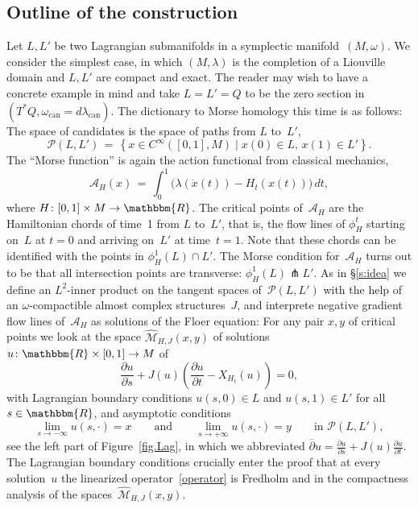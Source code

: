 \documentclass[12pt,twoside]{amsart}
\theoremstyle{plain}
\numberwithin{figure}{section}
\numberwithin{equation}{section}
\def\can{\operatorname{can}}
\def\go{\omega}
\def\ca{{\mathcal A}}
\def\cm{{\mathcal M}}
\def\cp{{\mathcal P}}
\def\RR{\mathbbm{R}}
\def\pp{\partial}
\begin{document}
\subsection{Outline of the construction}
Let $L, L'$ be two Lagrangian submanifolds in a symplectic manifold~$(M,\go)$.
We consider the simplest case, in which $(M,\lambda)$ is the completion of a Liouville domain
and $L,L'$ are compact and exact.
The reader may wish to have a concrete example in mind and take
$L=L'=Q$ to be the zero section in $(T^*Q, \omega_{\can} = d \lambda_{\can})$.
The dictionary to Morse homology this time is as follows:
The space of candidates is the space of paths from $L$ to~$L'$,
$$
\cp (L,L') \,=\, \left\{ x \in C^\infty ([0,1], M) \mid x(0) \in L,\, x(1) \in L' \right\} .
$$
The ``Morse function'' is again the action functional from classical mechanics, 
$$
\ca_H (x) \,=\, \int_0^1 \bigl( \lambda(\dot x(t)) - H_t (x(t)) \bigr) \,dt,
$$
where $H \colon [0,1] \times M \to \RR$.
The critical points of~$\ca_H$ are the Hamiltonian chords of time~1 from $L$ to~$L'$, that is, 
the flow lines of $\phi_H^t$ starting on~$L$ at $t=0$ and arriving on~$L'$ at time~$t=1$.
Note that these chords can be identified with the points in $\phi_H^1(L) \cap L'$.
The Morse condition for~$\ca_H$ turns out to be that all intersection points are transverse:
$\phi_H^1(L) \pitchfork L'$.
As in \S \ref{s:idea} we define an $L^2$-inner product on the tangent spaces of~$\cp (L,L')$ 
with the help of an 
$\go$-compactible almost complex structures~$J$, and interprete negative gradient flow lines 
of~$\ca_H$ as solutions of the Floer equation:
For any pair $x,y$ of critical points we look at the space $\widehat \cm_{H,J}(x,y)$ 
of solutions $u \colon \RR \times [0,1] \to M$ of 
\begin{equation}
\label{floerLag}
\frac{\partial u}{\partial s} + J(u) \left( \frac{\partial u}{\partial t} - X_{H_t}(u) \right) = 0,
\end{equation}
with Lagrangian boundary conditions $u(s,0) \in L$ and $u(s,1) \in L'$ for all $s \in \RR$, and
asymptotic conditions
\[
\lim_{s\rightarrow -\infty} u(s,\cdot) = x \qquad \mbox{and} \qquad 
\lim_{s\rightarrow +\infty} u(s,\cdot) = y \qquad \mbox{in } \cp (L,L'),
\]
see the left part of Figure~\ref{fig.Lag}, in which we abbreviated 
$\overline \pp u = \frac{\pp u}{\pp s} + J(u) \frac{\pp u}{\pp t}$.
%
The Lagrangian boundary conditions crucially enter the proof that at every solution~$u$ 
the linearized operator~\eqref{operator} is Fredholm and in the compactness analysis of the 
spaces~$\widehat{\cm}_{H,J}(x,y)$. 
\end{document}
